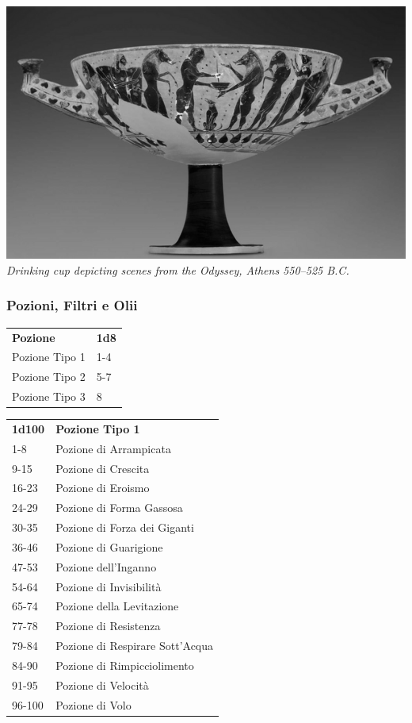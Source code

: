 \begin{multicols}{2}
	\begin{center}
		\includegraphics[width=0.8\linewidth]{immagini/cupdrinking.png}\\

		\textit{Drinking cup depicting scenes from the Odyssey, Athens 550–525 B.C.}
	\end{center}

	\subsubsection{Pozioni, Filtri e Olii}

	\begin{tabular}{ll}
		\textbf{Pozione}&\textbf{1d8}\\
		Pozione Tipo 1 &1-4\\
		Pozione Tipo 2 &5-7\\
		Pozione Tipo 3 &8\\
	\end{tabular}

	\medskip

	\begin{tabular}{ll}
		\textbf{1d100} & \textbf{Pozione Tipo 1}\\
		1-8   &Pozione di Arrampicata\\
		9-15  &Pozione di Crescita\\
		16-23 &Pozione di Eroismo\\
		24-29 &Pozione di Forma Gassosa\\
		30-35 &Pozione di Forza dei Giganti\\
		36-46 &Pozione di Guarigione\\
		47-53 &Pozione dell'Inganno\\
		54-64 &Pozione di Invisibilità\\
		65-74 &Pozione della Levitazione\\
		77-78 &Pozione di Resistenza\\
		79-84 &Pozione di Respirare Sott'Acqua\\
		84-90 &Pozione di Rimpicciolimento\\
		91-95 &Pozione di Velocità\\
		96-100 &Pozione di Volo\\
	\end{tabular}


\end{multicols}
